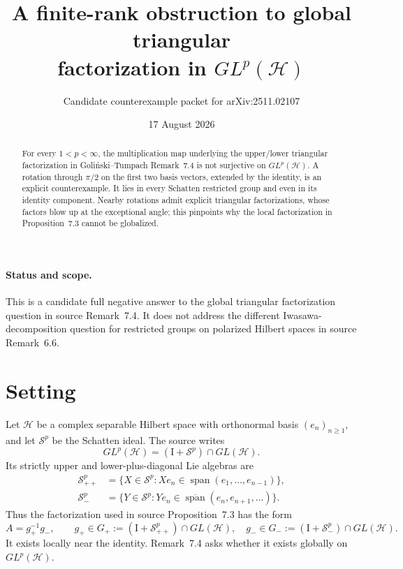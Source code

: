 \documentclass[11pt]{article}
\title{A finite-rank obstruction to global triangular\\
factorization in \(GL^p(\mathcal H)\)}
\author{Candidate counterexample packet for arXiv:2511.02107}
\date{17 August 2026}
\newcommand{\Hh}{\mathcal H}
\newcommand{\Sp}{\mathcal S^p}
\newcommand{\Id}{\mathrm I}
\newcommand{\clspan}{\overline{\operatorname{span}}}
\begin{document}
\maketitle

\begin{abstract}
For every \(1<p<\infty\), the multiplication map underlying the
upper/lower triangular factorization in Goli\'nski--Tumpach Remark~7.4 is not
surjective on \(GL^p(\mathcal H)\).  A rotation through \(\pi/2\) on the first
two basis vectors, extended by the identity, is an explicit counterexample.
It lies in every Schatten restricted group and even in its identity
component.  Nearby rotations admit explicit triangular factorizations, whose
factors blow up at the exceptional angle; this pinpoints why the local
factorization in Proposition~7.3 cannot be globalized.
\end{abstract}

\paragraph{Status and scope.}
This is a candidate full negative answer to the global triangular
factorization question in source Remark~7.4.  It does not address the
different Iwasawa-decomposition question for restricted groups on polarized
Hilbert spaces in source Remark~6.6.

\section{Setting}

Let \(\mathcal H\) be a complex separable Hilbert space with orthonormal basis
\((e_n)_{n\geq1}\), and let \(\mathcal S^p\) be the Schatten ideal.  The
source writes
\[
 GL^p(\Hh)=(\Id+\Sp)\cap GL(\Hh).
\]
Its strictly upper and lower-plus-diagonal Lie algebras are
\begin{align*}
 \Sp_{++}&=\{X\in\Sp:Xe_n\in\operatorname{span}(e_1,\ldots,e_{n-1})\},\\
 \Sp_-&=\{Y\in\Sp:Ye_n\in\clspan(e_n,e_{n+1},\ldots)\}.
\end{align*}
Thus the factorization used in source Proposition~7.3 has the form
\begin{equation}\label{eq:factor}
 A=g_+^{-1}g_-,\qquad
 g_+\in G_+:=(\Id+\Sp_{++})\cap GL(\Hh),\quad
 g_-\in G_-:=(\Id+\Sp_-)\cap GL(\Hh).
\end{equation}
It exists locally near the identity.  Remark~7.4 asks whether it exists
globally on \(GL^p(\Hh)\).
\end{document}
